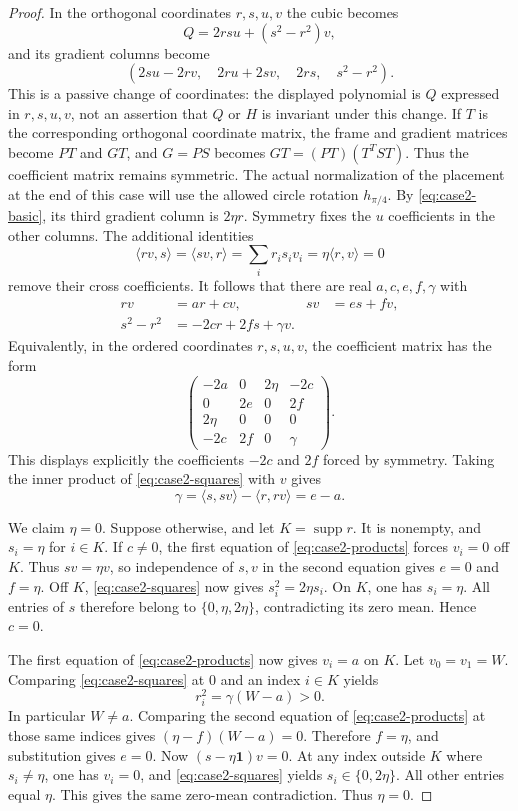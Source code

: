\documentclass[11pt,reqno]{amsart}
\theoremstyle{definition}
\theoremstyle{remark}
\numberwithin{equation}{section}
\newcommand{\one}{\mathbf 1}
\newcommand{\ip}[2]{\langle #1,#2\rangle}
\DeclareMathOperator{\supp}{supp}
\begin{document}
\begin{proof}
In the orthogonal coordinates $r,s,u,v$ the cubic becomes
\[
 Q=2rsu+(s^2-r^2)v,
\]
and its gradient columns become
\[
 (2su-2rv,\quad 2ru+2sv,\quad 2rs,\quad s^2-r^2).
\]
This is a passive change of coordinates: the displayed polynomial is
$Q$ expressed in $r,s,u,v$, not an assertion that $Q$ or $H$ is invariant
under this change. If $T$ is the corresponding orthogonal coordinate
matrix, the frame and gradient matrices become $PT$ and $GT$, and
$G=PS$ becomes $GT=(PT)(T^TST)$. Thus the coefficient matrix remains
symmetric. The actual normalization of the placement at the end of this
case will use the allowed circle rotation $h_{\pi/4}$. By \eqref{eq:case2-basic}, its third gradient column
is $2\eta r$. Symmetry fixes the $u$ coefficients in the other
columns. The additional identities
\[
 \ip{rv}{s}=\ip{sv}{r}=\sum_i r_is_iv_i
                         =\eta\ip r v=0
\]
remove their cross coefficients. It follows that there are real
$a,c,e,f,\gamma$ with
\begin{align}
 rv&=a r+c v,& sv&=e s+f v,\label{eq:case2-products}\\
 s^2-r^2&=-2c r+2f s+\gamma v.
                  \label{eq:case2-squares}
\end{align}
Equivalently, in the ordered coordinates $r,s,u,v$, the coefficient
matrix has the form
\[
 \begin{pmatrix}
 -2a&0&2\eta&-2c\\
 0&2e&0&2f\\
 2\eta&0&0&0\\
 -2c&2f&0&\gamma
 \end{pmatrix}.
\]
This displays explicitly the coefficients $-2c$ and $2f$ forced by
symmetry. Taking the inner product of
\eqref{eq:case2-squares} with $v$ gives
\begin{equation}\label{eq:case2-gamma}
 \gamma=\ip s{sv}-\ip r{rv}=e-a.
\end{equation}

We claim $\eta=0$. Suppose otherwise, and let $K=\supp r$.
It is nonempty, and $s_i=\eta$ for $i\in K$.
If $c\ne0$, the first equation of \eqref{eq:case2-products}
forces $v_i=0$ off $K$. Thus $sv=\eta v$, so independence of
$s,v$ in the second equation gives $e=0$ and $f=\eta$.
Off $K$, \eqref{eq:case2-squares} now gives
$s_i^2=2\eta s_i$. On $K$, one has $s_i=\eta$.
All entries of $s$ therefore belong to $\{0,\eta,2\eta\}$,
contradicting its zero mean. Hence $c=0$.

The first equation of \eqref{eq:case2-products} now gives $v_i=a$
on $K$. Let $v_0=v_1=W$. Comparing
\eqref{eq:case2-squares} at $0$ and an index $i\in K$ yields
\[
 r_i^2=\gamma(W-a)>0.
\]
In particular $W\ne a$. Comparing the second equation of
\eqref{eq:case2-products} at those same indices gives
$(\eta-f)(W-a)=0$. Therefore $f=\eta$, and substitution gives
$e=0$. Now $(s-\eta\one)v=0$. At any index outside $K$ where
$s_i\ne\eta$, one has $v_i=0$, and
\eqref{eq:case2-squares} yields $s_i\in\{0,2\eta\}$.
All other entries equal $\eta$. This gives the same zero-mean
contradiction. Thus $\eta=0$.


\end{proof}
\end{document}
